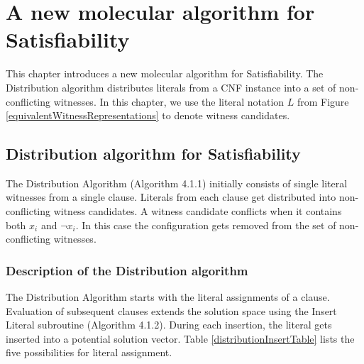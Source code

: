 
\chapter{A new molecular algorithm for {\sc Satisfiability}}

This chapter introduces a new molecular algorithm for {\sc Satisfiability}.  The Distribution algorithm distributes literals from a CNF instance into a set of non-conflicting witnesses.  In this chapter, we use the literal notation $L$ from Figure \ref{equivalentWitnessRepresentations} to denote witness candidates.

\section{Distribution algorithm for {\sc Satisfiability}}

The {\sc Distribution Algorithm} (Algorithm 4.1.1) initially consists of single literal witnesses from a single clause.  Literals from each clause get distributed into non-conflicting witness candidates.  A witness candidate conflicts when it contains both $x_i$ and $\neg x_i$.  In this case the configuration gets removed from the set of non-conflicting witnesses.  


\FloatBarrier

	\subsection{Description of the Distribution algorithm}
		
The {\sc Distribution Algorithm} starts with the literal assignments of a clause.  Evaluation of subsequent clauses extends the solution space using the {\sc Insert Literal} subroutine (Algorithm 4.1.2).  During each insertion, the literal gets inserted into a potential solution vector.  Table \ref{distributionInsertTable} lists the five possibilities for literal assignment.
	
